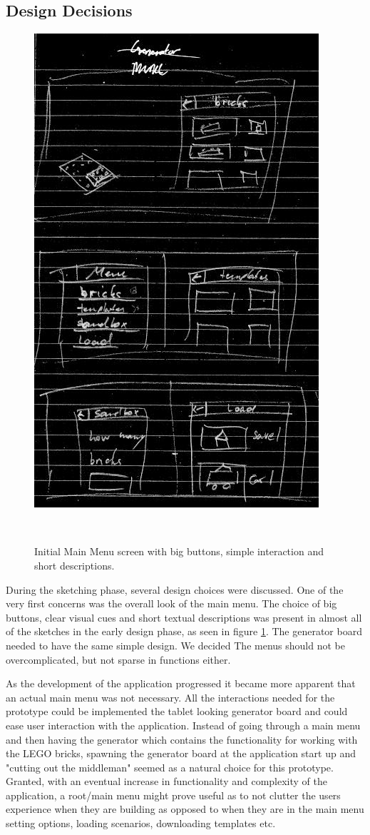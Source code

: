 \subsection{Design Decisions}
\begin{figure}[h]
	\centering
	\includegraphics[width=0.5\columnwidth]{figures/Menu/menu1.png}
	\caption{Initial Main Menu screen with big buttons, simple interaction and short descriptions.}~\label{fig:genboard}
\end{figure}
During the sketching phase, several design choices were discussed. One of the very first concerns was the overall look of the main menu. The choice of big buttons, clear visual cues and short textual descriptions was present in almost all of the sketches in the early design phase, as seen in figure \ref{fig:genboard}. The generator board needed to have the same simple design. We decided The menus should not be overcomplicated, but not sparse in functions either.\par
As the development of the application progressed it became more  apparent that an actual main menu was not necessary. All the interactions needed for the prototype could be implemented  the tablet looking generator board and could ease user interaction with the application. Instead of going through a main menu and then having the generator which contains the functionality for working with the LEGO bricks, spawning the generator board at the application start up and "cutting out the middleman" seemed as a natural choice for this prototype. Granted, with an eventual increase in functionality and complexity of the application, a root/main menu might prove useful as to not clutter the users experience when they are building as opposed to when they are in the main menu setting options, loading scenarios, downloading templates etc. 

